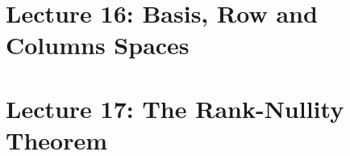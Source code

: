 \documentclass[oneside]{book}
\begin{document}
\section{Lecture 16: Basis, Row and Columns Spaces}










































\section{Lecture 17: The Rank-Nullity Theorem}
\end{document}
